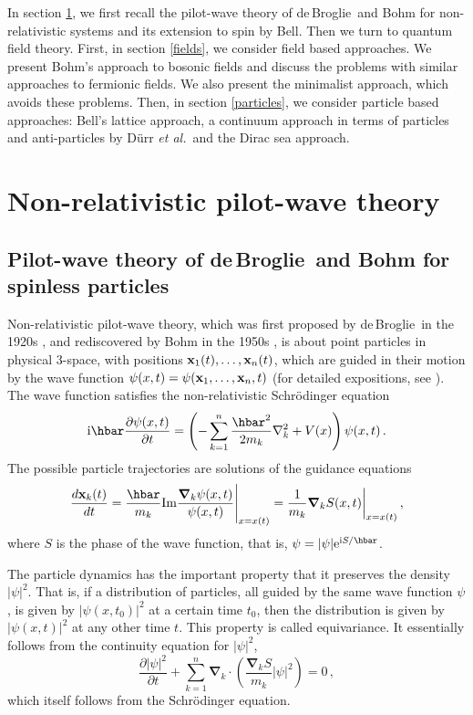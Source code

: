 \documentclass[12pt]{article}
\def\pa{\partial}
\def\fr{\frac}
\def\ii{\textrm i}
\def\ee{\textrm e}
\newcommand{\db}{de$\,$Broglie}
\begin{document}
In section \ref{nonrelativistic}, we first recall the pilot-wave theory of \db\ and Bohm for non-relativistic systems and its extension to spin by Bell. Then we turn to quantum field theory. First, in section \ref{fields}, we consider field based approaches. We present Bohm's approach to bosonic fields and discuss the problems with similar approaches to fermionic fields. We also present the minimalist approach, which avoids these problems. Then, in section \ref{particles}, we consider particle based approaches: Bell's lattice approach, a continuum approach in terms of particles and anti-particles by D\"urr {\em et al.}\ and the Dirac sea approach.


\section{Non-relativistic pilot-wave theory}\label{nonrelativistic}
\subsection{Pilot-wave theory of \db\ and Bohm for spinless particles} 
Non-relativistic pilot-wave theory, which was first proposed by \db\ in the 1920s \cite{debroglie28}, and rediscovered by Bohm in the 1950s \cite{bohm52a,bohm52b}, is about point particles in physical 3-space, with positions ${\bf x}_1(t), \dots,{\bf x}_n(t)$, which are guided in their motion by the wave function $\psi(x,t)=\psi({\bf x}_1, \dots,{\bf x}_n,t)$ (for detailed expositions, see \cite{bohm93,holland93b,durr09}). The wave function satisfies the non-relativistic Schr\"odinger equation
\begin{equation}
\ii \hbar \frac{\pa \psi(x,t)}{\pa t}  =  \left( -\sum^n_{k=1} \frac{\hbar^2 }{2m_k}\nabla^2_k + V(x) \right)  \psi(x,t) \,.
\label{1}
\end{equation}
The possible particle trajectories are solutions of the guidance equations 
\begin{equation}
\fr{d {\bf x}_k(t)}{dt} = \frac{\hbar}{m_k} {\textrm{Im}} \frac{{\boldsymbol {\nabla}}_k \psi(x,t)}{\psi(x,t)} \Bigg|_{x=x(t)} = \frac{1}{m_k} {\boldsymbol {\nabla}}_k S(x,t) \bigg|_{x=x(t)} \,,
\label{2}
\end{equation}
where $S$ is the phase of the wave function, that is, $\psi = |\psi|\ee^{\ii S/\hbar}$.

The particle dynamics has the important property that it preserves the density $|\psi|^2$. That is, if a distribution of particles, all guided by the same wave function $\psi$, is given by $|\psi(x,t_0)|^2$ at a certain time $t_0$, then the distribution is given by $|\psi(x,t)|^2$ at any other time $t$. This property is called equivariance. It essentially follows from the continuity equation for $|\psi|^2$,
\begin{equation}
\frac{\pa |\psi|^2}{\pa t} + \sum^n_{k=1}{\boldsymbol {\nabla}}_k \cdot \left( \frac{{\boldsymbol {\nabla}}_k S}{m_k} |\psi|^2 \right) = 0  \,,
\label{2.1}
\end{equation}
which itself follows from the Schr\"odinger equation. 
\end{document}
